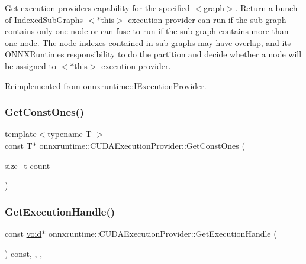 Get execution provider\textquotesingle{}s capability for the specified $<$graph$>$. Return a bunch of Indexed\+Sub\+Graphs $<$$\ast$this$>$ execution provider can run if the sub-\/graph contains only one node or can fuse to run if the sub-\/graph contains more than one node. The node indexes contained in sub-\/graphs may have overlap, and it\textquotesingle{}s O\+N\+N\+X\+Runtime\textquotesingle{}s responsibility to do the partition and decide whether a node will be assigned to $<$$\ast$this$>$ execution provider. 

Reimplemented from \mbox{\hyperlink{classonnxruntime_1_1IExecutionProvider_a6f17ba64b2355b26293a4cfc3fac376f}{onnxruntime\+::\+I\+Execution\+Provider}}.

\mbox{\label{classonnxruntime_1_1CUDAExecutionProvider_a76dc7ab7a7a58043697a83cb6c69be2e}} 
\subsubsection{\texorpdfstring{Get\+Const\+Ones()}{GetConstOnes()}}
{\footnotesize\ttfamily template$<$typename T $>$ \\
const T$\ast$ onnxruntime\+::\+C\+U\+D\+A\+Execution\+Provider\+::\+Get\+Const\+Ones (\begin{DoxyParamCaption}\item[{\mbox{\hyperlink{mlasi_8h_a503efbc1c6e50825320ad909366b78ab}{size\+\_\+t}}}]{count }\end{DoxyParamCaption})\hspace{0.3cm}{\ttfamily [inline]}}

\mbox{\label{classonnxruntime_1_1CUDAExecutionProvider_a1cf09f277e0559c0e864fa6b0d39c898}} 
\subsubsection{\texorpdfstring{Get\+Execution\+Handle()}{GetExecutionHandle()}}
{\footnotesize\ttfamily const \mbox{\hyperlink{mlasi_8h_a88f941d423cb2a819b70a1358982b1a6}{void}}$\ast$ onnxruntime\+::\+C\+U\+D\+A\+Execution\+Provider\+::\+Get\+Execution\+Handle (\begin{DoxyParamCaption}{ }\end{DoxyParamCaption}) const\hspace{0.3cm}{\ttfamily [inline]}, {\ttfamily [override]}, {\ttfamily [virtual]}, {\ttfamily [noexcept]}}

